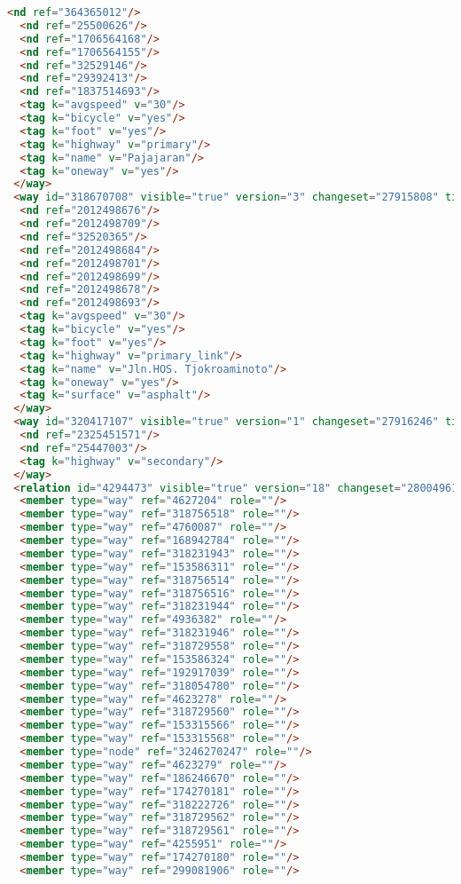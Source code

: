 \begin{lstlisting}[language=HTML,basicstyle=\tiny,caption=bandung1.xml]
  <nd ref="364365012"/>
  <nd ref="25500626"/>
  <nd ref="1706564168"/>
  <nd ref="1706564155"/>
  <nd ref="32529146"/>
  <nd ref="29392413"/>
  <nd ref="1837514693"/>
  <tag k="avgspeed" v="30"/>
  <tag k="bicycle" v="yes"/>
  <tag k="foot" v="yes"/>
  <tag k="highway" v="primary"/>
  <tag k="name" v="Pajajaran"/>
  <tag k="oneway" v="yes"/>
 </way>
 <way id="318670708" visible="true" version="3" changeset="27915808" timestamp="2015-01-04T17:54:58Z" user="isonpurba" uid="2552445">
  <nd ref="2012498676"/>
  <nd ref="2012498709"/>
  <nd ref="32520365"/>
  <nd ref="2012498684"/>
  <nd ref="2012498701"/>
  <nd ref="2012498699"/>
  <nd ref="2012498678"/>
  <nd ref="2012498693"/>
  <tag k="avgspeed" v="30"/>
  <tag k="bicycle" v="yes"/>
  <tag k="foot" v="yes"/>
  <tag k="highway" v="primary_link"/>
  <tag k="name" v="Jln.HOS. Tjokroaminoto"/>
  <tag k="oneway" v="yes"/>
  <tag k="surface" v="asphalt"/>
 </way>
 <way id="320417107" visible="true" version="1" changeset="27916246" timestamp="2015-01-04T18:10:18Z" user="isonpurba" uid="2552445">
  <nd ref="2325451571"/>
  <nd ref="25447003"/>
  <tag k="highway" v="secondary"/>
 </way>
 <relation id="4294473" visible="true" version="18" changeset="28004961" timestamp="2015-01-08T20:02:57Z" user="isonpurba" uid="2552445">
  <member type="way" ref="4627204" role=""/>
  <member type="way" ref="318756518" role=""/>
  <member type="way" ref="4760087" role=""/>
  <member type="way" ref="168942784" role=""/>
  <member type="way" ref="318231943" role=""/>
  <member type="way" ref="153586311" role=""/>
  <member type="way" ref="318756514" role=""/>
  <member type="way" ref="318756516" role=""/>
  <member type="way" ref="318231944" role=""/>
  <member type="way" ref="4936382" role=""/>
  <member type="way" ref="318231946" role=""/>
  <member type="way" ref="318729558" role=""/>
  <member type="way" ref="153586324" role=""/>
  <member type="way" ref="192917039" role=""/>
  <member type="way" ref="318054780" role=""/>
  <member type="way" ref="4623278" role=""/>
  <member type="way" ref="318729560" role=""/>
  <member type="way" ref="153315566" role=""/>
  <member type="way" ref="153315568" role=""/>
  <member type="node" ref="3246270247" role=""/>
  <member type="way" ref="4623279" role=""/>
  <member type="way" ref="186246670" role=""/>
  <member type="way" ref="174270181" role=""/>
  <member type="way" ref="318222726" role=""/>
  <member type="way" ref="318729562" role=""/>
  <member type="way" ref="318729561" role=""/>
  <member type="way" ref="4255951" role=""/>
  <member type="way" ref="174270180" role=""/>
  <member type="way" ref="299081906" role=""/>

\end{lstlisting}
